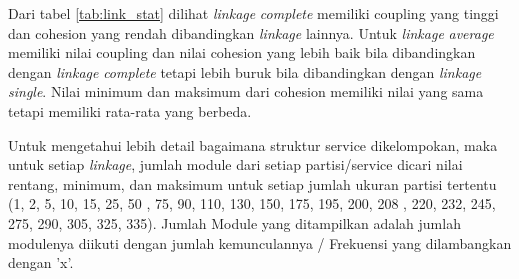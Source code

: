 Dari tabel \ref{tab:link_stat} dilihat \textit{linkage} \textit{complete} memiliki coupling yang tinggi dan cohesion yang rendah dibandingkan \textit{linkage} lainnya. Untuk \textit{linkage} \textit{average} memiliki nilai coupling dan nilai cohesion yang lebih baik  bila dibandingkan dengan \textit{linkage} \textit{complete} tetapi lebih buruk bila dibandingkan dengan \textit{linkage} \textit{single}. Nilai  minimum dan maksimum dari cohesion memiliki nilai yang sama tetapi memiliki rata-rata yang berbeda. 

Untuk mengetahui lebih detail bagaimana struktur service dikelompokan, maka untuk setiap \textit{linkage}, jumlah module dari setiap partisi/service dicari nilai rentang, minimum, dan maksimum untuk setiap jumlah ukuran partisi tertentu (1, 2, 5, 10, 15, 25, 50 , 75, 90, 110, 130, 150, 175, 195, 200, 208 , 220, 232,  245, 275, 290, 305, 325, 335). Jumlah Module yang ditampilkan adalah jumlah modulenya diikuti dengan jumlah kemunculannya / Frekuensi yang dilambangkan dengan 'x'.

